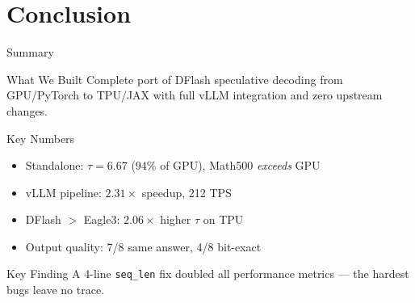 \documentclass[10pt]{beamer}
\begin{document}
\section{Conclusion}

\begin{frame}{Summary}
\begin{block}{What We Built}
Complete port of DFlash speculative decoding from GPU/PyTorch to TPU/JAX with full vLLM integration and zero upstream changes.
\end{block}

\begin{block}{Key Numbers}
\begin{itemize}
  \item Standalone: $\tau = 6.67$ (94\% of GPU), Math500 \emph{exceeds} GPU
  \item vLLM pipeline: $2.31\times$ speedup, 212 TPS
  \item DFlash $>$ Eagle3: $2.06\times$ higher $\tau$ on TPU
  \item Output quality: 7/8 same answer, 4/8 bit-exact
\end{itemize}
\end{block}

\begin{alertblock}{Key Finding}
A 4-line \texttt{seq\_len} fix doubled all performance metrics --- the hardest bugs leave no trace.
\end{alertblock}
\end{frame}
\end{document}
